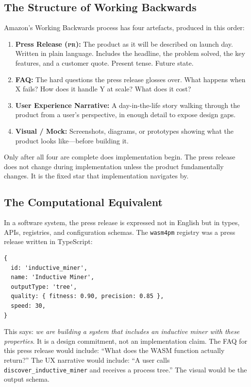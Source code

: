 \documentclass[11pt,a4paper]{article}
\newcommand{\code}[1]{\texttt{#1}}
\newcommand{\pr}{\textsc{pr}}
\begin{document}
\subsection{The Structure of Working Backwards}

Amazon's Working Backwards process has four artefacts, produced in this order:

\begin{enumerate}
  \item \textbf{Press Release (\pr):} The product as it will be described on
    launch day.  Written in plain language.  Includes the headline, the
    problem solved, the key features, and a customer quote.  Present tense.
    Future state.

  \item \textbf{FAQ:} The hard questions the press release glosses over.
    What happens when X fails?  How does it handle Y at scale?  What does
    it cost?

  \item \textbf{User Experience Narrative:} A day-in-the-life story walking
    through the product from a user's perspective, in enough detail to expose
    design gaps.

  \item \textbf{Visual / Mock:} Screenshots, diagrams, or prototypes showing
    what the product looks like---before building it.
\end{enumerate}

Only after all four are complete does implementation begin.  The press release
does not change during implementation unless the product fundamentally changes.
It is the fixed star that implementation navigates by.

\subsection{The Computational Equivalent}

In a software system, the press release is expressed not in English but in
types, APIs, registries, and configuration schemas.  The \code{wasm4pm} registry
was a press release written in TypeScript:

\begin{lstlisting}
{
  id: 'inductive_miner',
  name: 'Inductive Miner',
  outputType: 'tree',
  quality: { fitness: 0.90, precision: 0.85 },
  speed: 30,
}
\end{lstlisting}

This says: \emph{we are building a system that includes an inductive miner with
these properties}.  It is a design commitment, not an implementation claim.
The FAQ for this press release would include: ``What does the WASM function
actually return?''  The UX narrative would include: ``A user calls
\code{discover\_inductive\_miner} and receives a process tree.''  The visual
would be the output schema.
\end{document}
